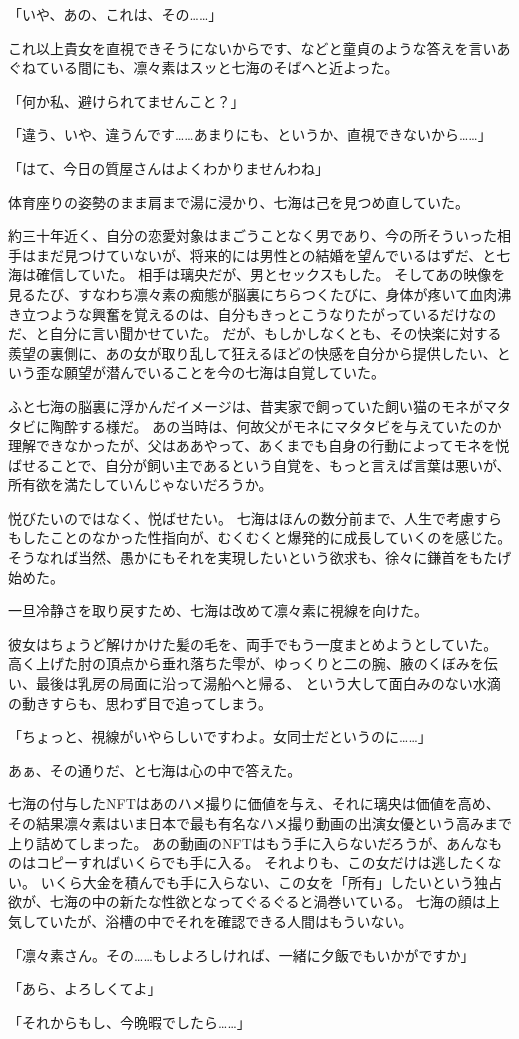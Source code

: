 「いや、あの、これは、その……」

これ以上貴女を直視できそうにないからです、などと童貞のような答えを言いあぐねている間にも、凛々素はスッと七海のそばへと近よった。

「何か私、避けられてませんこと？」

「違う、いや、違うんです……あまりにも、というか、直視できないから……」

「はて、今日の質屋さんはよくわかりませんわね」

体育座りの姿勢のまま肩まで湯に浸かり、七海は己を見つめ直していた。

約三十年近く、自分の恋愛対象はまごうことなく男であり、今の所そういった相手はまだ見つけていないが、将来的には男性との結婚を望んでいるはずだ、と七海は確信していた。
相手は璃央だが、男とセックスもした。
そしてあの映像を見るたび、すなわち凛々素の痴態が脳裏にちらつくたびに、身体が疼いて血肉沸き立つような興奮を覚えるのは、自分もきっとこうなりたがっているだけなのだ、と自分に言い聞かせていた。
だが、もしかしなくとも、その快楽に対する羨望の裏側に、あの女が取り乱して狂えるほどの快感を自分から提供したい、という歪な願望が潜んでいることを今の七海は自覚していた。

ふと七海の脳裏に浮かんだイメージは、昔実家で飼っていた飼い猫のモネがマタタビに陶酔する様だ。
あの当時は、何故父がモネにマタタビを与えていたのか理解できなかったが、父はああやって、あくまでも自身の行動によってモネを悦ばせることで、自分が飼い主であるという自覚を、もっと言えば言葉は悪いが、所有欲を満たしていんじゃないだろうか。

悦びたいのではなく、悦ばせたい。
七海はほんの数分前まで、人生で考慮すらもしたことのなかった性指向が、むくむくと爆発的に成長していくのを感じた。
そうなれば当然、愚かにもそれを実現したいという欲求も、徐々に鎌首をもたげ始めた。

一旦冷静さを取り戻すため、七海は改めて凛々素に視線を向けた。

彼女はちょうど解けかけた髪の毛を、両手でもう一度まとめようとしていた。
高く上げた肘の頂点から垂れ落ちた雫が、ゆっくりと二の腕、腋のくぼみを伝い、最後は乳房の局面に沿って湯船へと帰る、
という大して面白みのない水滴の動きすらも、思わず目で追ってしまう。

「ちょっと、視線がいやらしいですわよ。女同士だというのに……」

あぁ、その通りだ、と七海は心の中で答えた。

七海の付与したNFTはあのハメ撮りに価値を与え、それに璃央は価値を高め、その結果凛々素はいま日本で最も有名なハメ撮り動画の出演女優という高みまで上り詰めてしまった。
あの動画のNFTはもう手に入らないだろうが、あんなものはコピーすればいくらでも手に入る。
それよりも、この女だけは逃したくない。
いくら大金を積んでも手に入らない、この女を「所有」したいという独占欲が、七海の中の新たな性欲となってぐるぐると渦巻いている。
七海の顔は上気していたが、浴槽の中でそれを確認できる人間はもういない。

「凛々素さん。その……もしよろしければ、一緒に夕飯でもいかがですか」

「あら、よろしくてよ」

「それからもし、今晩暇でしたら……」

